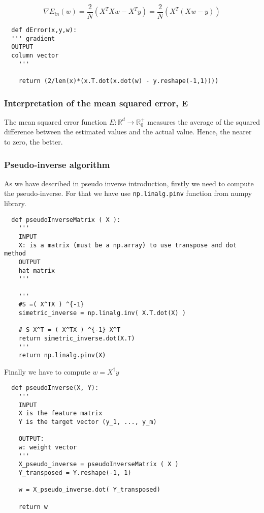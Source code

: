   $$\nabla E_{in}(w) = \frac{2}{N}(X^TXw - X^T y)= \frac{2}{N}(X^T(Xw -  y))$$
  
\begin{verbatim}
  def dError(x,y,w):
  ''' gradient
  OUTPUT
  column vector
    '''

    return (2/len(x)*(x.T.dot(x.dot(w) - y.reshape(-1,1))))
  \end{verbatim}

  \subsubsection{Interpretation of the mean squared error, E}
  The mean squared error function $E: \mathbb R ^d \longrightarrow \mathbb R^+_0$ measures the average of the squared difference between the estimated values and the actual value\cite{MSE}. Hence, the nearer to zero, the better.

  
  

\subsubsection{Pseudo-inverse algorithm}

As we have described in pseudo inverse introduction, firstly we need to compute the pseudo-inverse. For that we have use  \texttt{np.linalg.pinv} \cite{pseudo-inverse}function from numpy library.

\begin{verbatim}
  def pseudoInverseMatrix ( X ):
    '''
    INPUT 
    X: is a matrix (must be a np.array) to use transpose and dot method
    OUTPUT
    hat matrix 
    '''

    '''
    #S =( X^TX ) ^{-1}
    simetric_inverse = np.linalg.inv( X.T.dot(X) )

    # S X^T = ( X^TX ) ^{-1} X^T
    return simetric_inverse.dot(X.T)
    '''
    return np.linalg.pinv(X)
\end{verbatim}

Finally we have to compute $w = X^\dagger y$


\begin{verbatim}
  def pseudoInverse(X, Y):
    ''' 
    INPUT
    X is the feature matrix 
    Y is the target vector (y_1, ..., y_m)
    
    OUTPUT: 
    w: weight vector
    '''
    X_pseudo_inverse = pseudoInverseMatrix ( X )
    Y_transposed = Y.reshape(-1, 1)
    
    w = X_pseudo_inverse.dot( Y_transposed)
    
    return w

  \end{verbatim}

